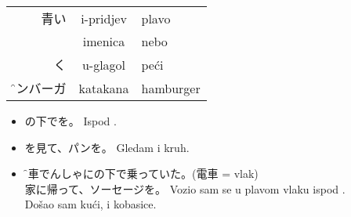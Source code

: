 \documentclass[pig]{grampig}
\begin{document}
	\begin{minipage}{\width}
		\onehalfspacing
%		
%		
%		
		
		\begin{table}
			\centering
			\textsc{} \br
			\begin{tabular}{RCl}
				青い & i-pridjev & plavo \\
				 & imenica & nebo \\
				く & u-glagol & peći \\
				\f{ハンバーガ}{\strut} & katakana & hamburger \\
			\end{tabular}
		\end{table} \vspace{-1em}
		
		\singlespacing
		\begin{itemize}
			\item {}の下でを。\bh
			Ispod  . \\[-0.5em]
			
			\item {}を見て、パンを。\bh
			Gledam  i  kruh. \\[-0.5em]
			
			\item {}\f{電車}{でんしゃ}にの下で乗っていた。\hfill ({電車} = vlak)\\
			家に帰って、ソーセージを。\bh
			Vozio sam se u plavom vlaku ispod . \\
			Došao sam kući, i  kobasice. 
		\end{itemize}
	
		\begin{center}
		\end{center}
	\end{minipage}
\end{document}
